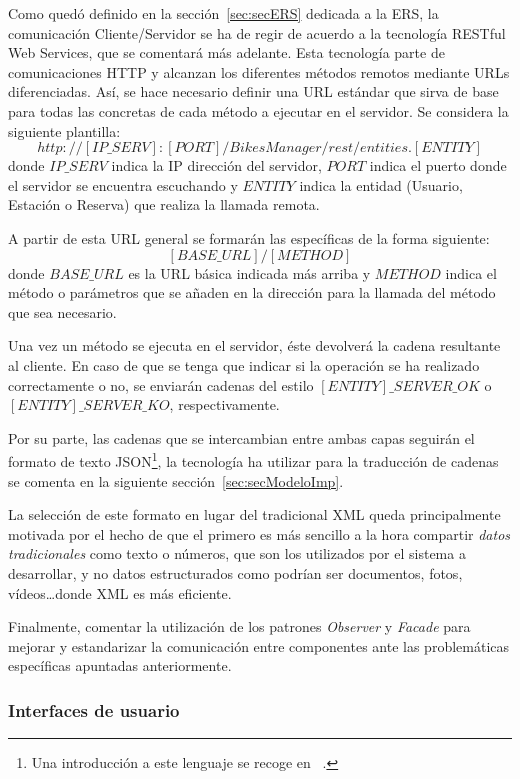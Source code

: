 Como quedó definido en la sección~\ref{sec:secERS} dedicada a la ERS, la comunicación Cliente/Servidor se ha de regir de acuerdo a la tecnología RESTful Web Services, que se comentará más adelante. Esta tecnología parte de comunicaciones HTTP y alcanzan los diferentes métodos remotos mediante URLs diferenciadas. Así, se hace necesario definir una URL estándar que sirva de base para todas las concretas de cada método a ejecutar en el servidor. Se considera la siguiente plantilla: $$http://[IP\_SERV]:[PORT]/BikesManager/rest/entities.[ENTITY]$$
donde $IP\_SERV$ indica la IP dirección del servidor, $PORT$ indica el puerto donde el servidor se encuentra escuchando y $ENTITY$ indica la entidad (Usuario, Estación o Reserva) que realiza la llamada remota.

A partir de esta URL general se formarán las específicas de la forma siguiente: $$[BASE\_URL]/[METHOD]$$
donde $BASE\_URL$ es la URL básica indicada más arriba y $METHOD$ indica el método o parámetros que se añaden en la dirección para la llamada del método que sea necesario.

Una vez un método se ejecuta en el servidor, éste devolverá la cadena resultante al cliente. En caso de que se tenga que indicar si la operación se ha realizado correctamente o no, se enviarán cadenas del estilo $[ENTITY]\_SERVER\_OK$ o $[ENTITY]\_SERVER\_KO$, respectivamente.

Por su parte, las cadenas que se intercambian entre ambas capas seguirán el formato de texto JSON\footnote{Una introducción a este lenguaje se recoge en ~\cite{JSON}.}, la tecnología ha utilizar para la traducción de cadenas se comenta en la siguiente sección~\ref{sec:secModeloImp}.

La selección de este formato en lugar del tradicional XML queda principalmente motivada por el hecho de que el primero es más sencillo a la hora compartir \emph{datos tradicionales} como texto o números, que son los utilizados por el sistema a desarrollar, y no datos estructurados como podrían ser documentos, fotos, vídeos\dots donde XML es más eficiente.

Finalmente, comentar la utilización de los patrones \emph{Observer} y \emph{Facade} para mejorar y estandarizar la comunicación entre componentes ante las problemáticas específicas apuntadas anteriormente.

\subsubsection{Interfaces de usuario}

